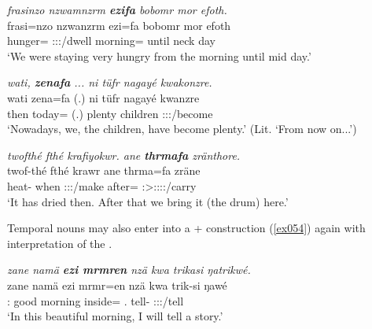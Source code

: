 \begin{exe}
	\ex \emph{frasinzo nzwamnzrm \textbf{ezifa} bobomr mor efoth.}\\
	\gll frasi=nzo nzwanzrm ezi=fa bobomr mor efoth\\
	hunger=\Only{} \Fpl:\Sbj:\Pst:\Dur/dwell morning=\Abl{} until neck day\\
	\trans `We were staying very hungry from the morning until mid day.'\\ 
	\label{ex053}
\end{exe}
\begin{exe}
	\ex \emph{wati, \textbf{zenafa} ... ni tüfr nagayé kwakonzre.}\\
	\gll wati zena=fa (.) ni tüfr nagayé kwanzre\\
	then today=\Abl{} (.) \Fnsg{} plenty children \Fpl:\Sbj:\Rpst:\Ipfv/become\\
	\trans `Nowadays, we, the children, have become plenty.' (Lit. `From now on...')\\ 
	\label{ex056}
\end{exe}
\begin{exe}
	\ex \emph{twofthé fthé krafiyokwr. ane \textbf{thrmafa} zränthore.}\\
	\gll twof-thé fthé krawr ane thrma=fa zräne\\
	heat-\Adlzr{} when \Stsg:\Sbj:\Irr:\Ipfv/make \Dem{} after=\Abl{} \Fpl:\Sbj>\Tsg:\F:\Irr:\Pfv:\Venit/carry\\
	\trans `It has dried then. After that we bring it (the drum) here.'\\ 
	\label{ex059}
\end{exe}

Temporal nouns may also enter into a + construction (\ref{ex054}) again with  interpretation of the .

\begin{exe}
	\ex \emph{zane namä \textbf{ezi mrmren} nzä kwa trikasi ŋatrikwé.}\\
	\gll zane namä ezi mrmr=en nzä kwa trik-si ŋawé\\
	\Dem{}:\Prox{} good morning inside=\Loc{} \Fsg{}.\Abs{} \Fut{} tell-\Nmlz{} \Fsg{}:\Sbj:\Nonpast:\Ipfv/tell\\
	\trans `In this beautiful morning, I will tell a story.' 
	\label{ex054}
\end{exe}

